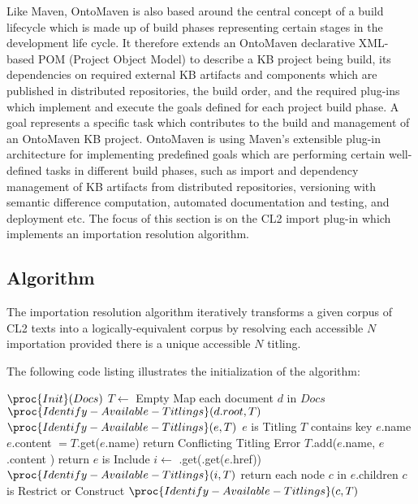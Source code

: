 \documentclass{IOS-Book-Article}
\begin{document}
Like Maven, OntoMaven is also based around the central concept of a build lifecycle which is made up of build phases representing certain stages in the development life cycle.  
It therefore extends an OntoMaven declarative XML-based POM (Project Object Model) to describe a KB project being build, its dependencies on required external KB artifacts and components which are published in distributed repositories, the build order, and the required plug-ins which implement and execute the goals defined for each project build phase. 
A goal represents a specific task which contributes to the build and management of an OntoMaven KB project. 
OntoMaven is using Maven's extensible plug-in architecture for implementing predefined goals which are performing certain well-defined tasks in different build phases, such as import and dependency management of KB artifacts from distributed repositories, versioning with semantic difference computation, automated documentation and testing, and deployment etc. 
The focus of this section is on the CL2 import plug-in  which implements an importation resolution algorithm.

\subsection{Algorithm}

The importation resolution algorithm iteratively transforms a given corpus of CL2 texts into a logically-equivalent corpus by resolving each accessible $N$ importation provided there is a unique accessible $N$ titling. 

The following code listing illustrates the initialization of the algorithm:

\begin{codebox}
\li $\proc{Init}(Docs)$
\li $T \gets$ Empty Map
\li \For each document $d$ in $Docs$
\li \Do $\proc{Identify-Available-Titlings}(d.root, T)$
\End %
\zi
\li $\proc{Identify-Available-Titlings}(e, T)$ \label{li:corpus}
\li \If $e$ is Titling
\li     \Then \If $T$ contains key $e$.name
\li         \Then \If $e$.content $= T$.get($e$.name)
\li             \Then return
\li             \Else Conflicting Titling Error
\End     %
\li         \Else $T$.add($e$.name, $e$.content ) \label{li:titling_add}
\End   %
\li return
\End %
\li \If $e$ is Include
\li     \Then
\li         $i \gets$ .get(.get($e$.href))
\li         $\proc{Identify-Available-Titlings}(i, T)$
\li return
\End %
\li \For each node $c$ in $e$.children
\li   \Do  \If $c$ is Restrict or Construct
\li     \Then  $\proc{Identify-Available-Titlings}(c, T)$
\End %
\End %
\end{codebox}
\end{document}
